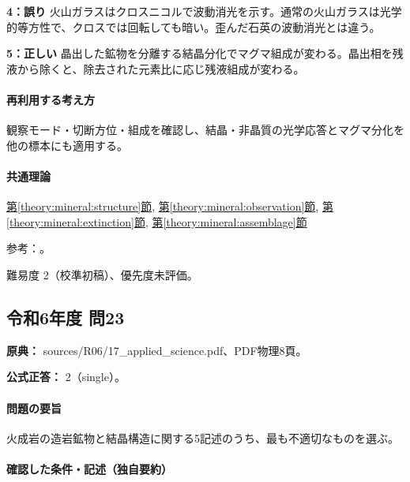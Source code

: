 \noindent\textbf{4：誤り} 火山ガラスはクロスニコルで波動消光を示す。通常の火山ガラスは光学的等方性で、クロスでは回転しても暗い。歪んだ石英の波動消光とは違う。\par

\noindent\textbf{5：正しい} 晶出した鉱物を分離する結晶分化でマグマ組成が変わる。晶出相を残液から除くと、除去された元素比に応じ残液組成が変わる。\par

\paragraph{再利用する考え方} 観察モード・切断方位・組成を確認し、結晶・非晶質の光学応答とマグマ分化を他の標本にも適用する。

\paragraph{共通理論} \hyperref[theory:mineral:structure]{第\ref*{theory:mineral:structure}節}, \hyperref[theory:mineral:observation]{第\ref*{theory:mineral:observation}節}, \hyperref[theory:mineral:extinction]{第\ref*{theory:mineral:extinction}節}, \hyperref[theory:mineral:assemblage]{第\ref*{theory:mineral:assemblage}節}

\par 参考：\cite{hom_biotite,hom_augite,nelson_inosilicates,usgs_igneous_components}。

\par 難易度 2（校準初稿）、優先度未評価。

\subsection{令和6年度 問23}
\label{q:r06-reg-applied-23}

\noindent\textbf{原典：} sources/R06/17\_applied\_science.pdf、PDF物理8頁。

\textbf{公式正答：} 2（single）。

\paragraph{問題の要旨} 火成岩の造岩鉱物と結晶構造に関する5記述のうち、最も不適切なものを選ぶ。

\paragraph{確認した条件・記述（独自要約）}\mbox{}\par

